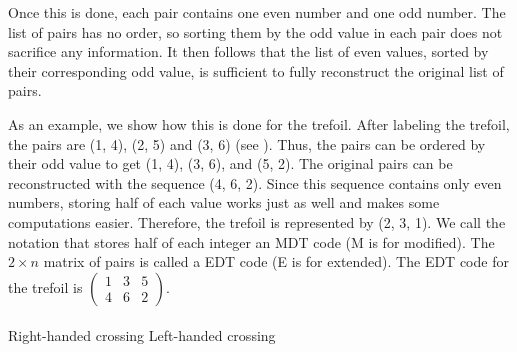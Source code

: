 \begin{paper}
Once this is done, each pair contains one even number and one odd number.
The list of pairs has no order, so sorting them by the odd value in each pair
does not sacrifice any information.
It then follows that the list of even values, sorted by their corresponding odd
value, is sufficient to fully reconstruct the original list of pairs.\\

\begin{center}\end{center}


As an example, we show how this is done for the trefoil.
After labeling the trefoil, the pairs are (1, 4), (2, 5) and (3, 6) (see
\figLabeled).
Thus, the pairs can be ordered by their odd value to get (1, 4), (3, 6), and
(5, 2).
The original pairs can be reconstructed with the sequence (4, 6, 2).
Since this sequence contains only even numbers, storing half of each value works
just as well and makes some computations easier.
Therefore, the trefoil is represented by (2, 3, 1).
We call the notation that stores half of each integer an MDT code (M is for
modified).
The $2\times n$ matrix of pairs is called a EDT code (E is for extended).
The EDT code for the trefoil is $\begin{pmatrix}1&3&5\\4&6&2\end{pmatrix}$.\\

\hfill
{}\\

{\noindent\fontsize{9pt}{1em}\selectfont Right-handed crossing\hfill
Left-handed crossing}\\



\end{paper}
